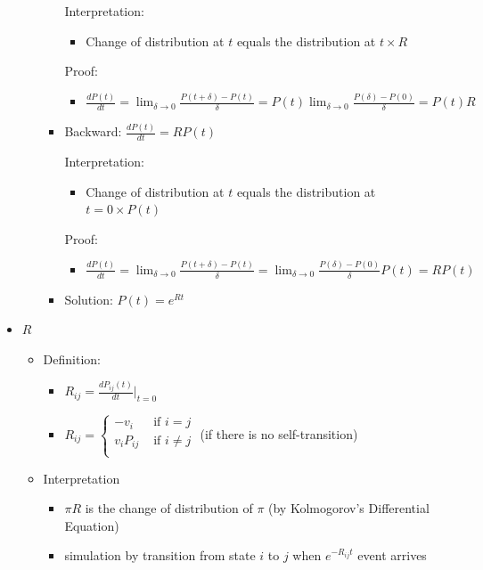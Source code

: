 \documentclass[a4paper]{article}
\begin{document}
\begin{itemize}
\begin{itemize}
\begin{itemize}
                        Interpretation:
                        \begin{itemize}
                            \item Change of distribution at $t$ equals the distribution at $t \times R$
                        \end{itemize}
                        Proof:
                        \begin{itemize}
                            \item $\frac{d P(t)}{dt} = \lim_{\delta \rightarrow 0} \frac{P(t+\delta) - P(t)}{\delta} = P(t) \lim_{\delta \rightarrow 0} \frac{P(\delta) - P(0)}{\delta} = P(t) R$
                        \end{itemize}
                    \item Backward: $\frac{d P(t)}{dt} = R P(t)$

                        Interpretation:
                        \begin{itemize}
                            \item Change of distribution at $t$ equals the distribution at $t = 0 \times P(t)$
                        \end{itemize}
                        Proof:
                        \begin{itemize}
                            \item $\frac{d P(t)}{dt} = \lim_{\delta \rightarrow 0} \frac{P(t+\delta) - P(t)}{\delta} = \lim_{\delta \rightarrow 0} \frac{P(\delta) - P(0)}{\delta} P(t) = R P(t)$
                        \end{itemize}
                    \item Solution: $P(t) = e^{Rt}$
                \end{itemize}
        \end{itemize}
    \item $R$
        \begin{itemize}
            \item Definition:
                \begin{itemize}
                    \item $R_{ij} = \frac{d P_{ij}(t)}{d t} |_{t = 0}$
                    \item $R_{ij} = \left\{ \begin{array}{cc} -v_i & \text{ if $i = j$} \\ v_i P_{ij} & \text{ if $i \not = j$} \\ \end{array} \right.$ (if there is no self-transition)
                \end{itemize}
            \item Interpretation
                \begin{itemize}
                    \item $\pi R$ is the change of distribution of $\pi$ (by Kolmogorov's Differential Equation)
                    \item simulation by transition from state $i$ to $j$ when $e^{-R_{ij}t}$ event arrives


\end{itemize}
\end{itemize}
\end{itemize}
\end{document}
